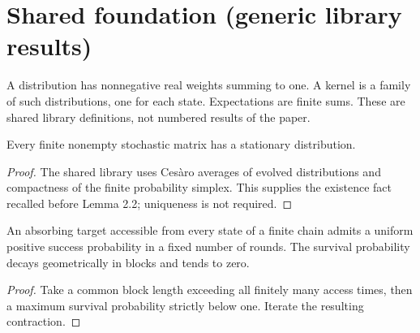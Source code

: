 \begin{abstract}
We formalize Sections 2.1--2.3 of Hassin and Peleg,
\emph{Distributed Probabilistic Polling and Applications to Proportionate Agreement},
Information and Computation 171 (2001), 248--268.
The synchronous process uses independent neighbor samples with directional weights.
On a finite connected nonbipartite undirected graph it reaches consensus with
probability one, and each color wins with its initial stationary vertex weight.
No path-space measure is needed: eventual probabilities are suprema of increasing
finite-time consensus probabilities.
\end{abstract}

\section{Shared foundation (generic library results)}
\begin{definition}\label{def:weights}
\leanok
A distribution has nonnegative real weights summing to one. A kernel is a
family of such distributions, one for each state. Expectations are finite sums.
These are shared library definitions, not numbered results of the paper.
\end{definition}
\begin{theorem}\label{thm:stationary}
\leanok{}
Every finite nonempty stochastic matrix has a stationary distribution.
\end{theorem}
\begin{proof}\leanok
The shared library uses Ces\`aro averages of evolved distributions and
compactness of the finite probability simplex. This supplies the existence
fact recalled before Lemma 2.2; uniqueness is not required.
\end{proof}
\begin{theorem}\label{thm:generic-absorption}
\leanok{}
An absorbing target accessible from every state of a finite chain admits a
uniform positive success probability in a fixed number of rounds. The survival
probability decays geometrically in blocks and tends to zero.
\end{theorem}
\begin{proof}\leanok
Take a common block length exceeding all finitely many access times, then a
maximum survival probability strictly below one. Iterate the resulting contraction.
\end{proof}
